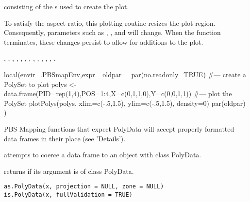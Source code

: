 \documentclass[letterpaper]{book}
\begin{document}
%
\begin{Value}
 consisting of the s used to create the plot.
\end{Value}
%
\begin{Note}\relax
To satisfy the aspect ratio, this plotting routine resizes the plot
region.  Consequently,  parameters such as
, , and  will change.  When the function
terminates, these changes persist to allow for additions to the plot.
\end{Note}
%
\begin{SeeAlso}\relax
{},
,
,
,
,
,
,
,
,
,
,
,
.
\end{SeeAlso}
%
\begin{Examples}
\begin{ExampleCode}
local(envir=.PBSmapEnv,expr={
  oldpar = par(no.readonly=TRUE)
  #--- create a PolySet to plot
  polys <- data.frame(PID=rep(1,4),POS=1:4,X=c(0,1,1,0),Y=c(0,0,1,1))
  #--- plot the PolySet
  plotPolys(polys, xlim=c(-.5,1.5), ylim=c(-.5,1.5), density=0)
  par(oldpar)
})
\end{ExampleCode}
\end{Examples}
%
\begin{Description}\relax
PBS Mapping functions that expect PolyData will accept properly
formatted data frames in their place (see 'Details').

 attempts to coerce a data frame to an object with
class PolyData.

 returns  if its argument is of class
PolyData.
\end{Description}
%
\begin{Usage}
\begin{verbatim}
as.PolyData(x, projection = NULL, zone = NULL)
is.PolyData(x, fullValidation = TRUE)
\end{verbatim}
\end{Usage}
\end{document}
